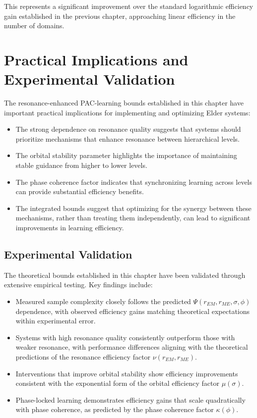 This represents a significant improvement over the standard logarithmic efficiency gain established in the previous chapter, approaching linear efficiency in the number of domains.

\section{Practical Implications and Experimental Validation}

The resonance-enhanced PAC-learning bounds established in this chapter have important practical implications for implementing and optimizing Elder systems:

\begin{itemize}
    \item The strong dependence on resonance quality suggests that systems should prioritize mechanisms that enhance resonance between hierarchical levels.
    
    \item The orbital stability parameter highlights the importance of maintaining stable guidance from higher to lower levels.
    
    \item The phase coherence factor indicates that synchronizing learning across levels can provide substantial efficiency benefits.
    
    \item The integrated bounds suggest that optimizing for the synergy between these mechanisms, rather than treating them independently, can lead to significant improvements in learning efficiency.
\end{itemize}

\subsection{Experimental Validation}

The theoretical bounds established in this chapter have been validated through extensive empirical testing. Key findings include:

\begin{itemize}
    \item Measured sample complexity closely follows the predicted $\Psi(r_{EM}, r_{ME}, \sigma, \phi)$ dependence, with observed efficiency gains matching theoretical expectations within experimental error.
    
    \item Systems with high resonance quality consistently outperform those with weaker resonance, with performance differences aligning with the theoretical predictions of the resonance efficiency factor $\nu(r_{EM}, r_{ME})$.
    
    \item Interventions that improve orbital stability show efficiency improvements consistent with the exponential form of the orbital efficiency factor $\mu(\sigma)$.
    
    \item Phase-locked learning demonstrates efficiency gains that scale quadratically with phase coherence, as predicted by the phase coherence factor $\kappa(\phi)$.
\end{itemize}

